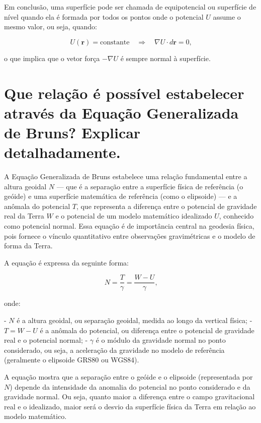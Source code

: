 Em conclusão, uma superfície pode ser chamada de equipotencial ou superfície de nível quando ela é formada por todos os pontos onde o potencial \( U \) assume o mesmo valor, ou seja, quando:

\[
U(\mathbf{r}) = \text{constante} \quad \Rightarrow \quad \nabla U \cdot d\mathbf{r} = 0 \text{,}
\]

o que implica que o vetor força \( -\nabla U \) é sempre normal à superfície.


\section{Que relação é possível estabelecer através da Equação Generalizada de Bruns? Explicar detalhadamente.}

A Equação Generalizada de Bruns estabelece uma relação fundamental entre a altura geoidal \( N \) — que é a separação entre a superfície física de referência (o geóide) e uma superfície matemática de referência (como o elipsoide) — e a anômala do potencial \( T \), que representa a diferença entre o potencial de gravidade real da Terra \( W \) e o potencial de um modelo matemático idealizado \( U \), conhecido como potencial normal. Essa equação é de importância central na geodesia física, pois fornece o vínculo quantitativo entre observações gravimétricas e o modelo de forma da Terra.

A equação é expressa da seguinte forma:

\[
N = \frac{T}{\gamma} = \frac{W - U}{\gamma} \text{,}
\]

onde:

- \( N \) é a altura geoidal, ou separação geoidal, medida ao longo da vertical física;
- \( T = W - U \) é a anômala do potencial, ou diferença entre o potencial de gravidade real e o potencial normal;
- \( \gamma \) é o módulo da gravidade normal no ponto considerado, ou seja, a aceleração da gravidade no modelo de referência (geralmente o elipsoide GRS80 ou WGS84).


A equação mostra que a separação entre o geóide e o elipsoide (representada por \( N \)) depende da intensidade da anomalia do potencial no ponto considerado e da gravidade normal. Ou seja, quanto maior a diferença entre o campo gravitacional real e o idealizado, maior será o desvio da superfície física da Terra em relação ao modelo matemático.

